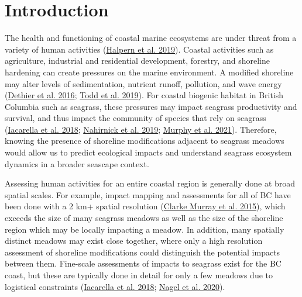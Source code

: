 \documentclass[12pt]{article}\usepackage[]{graphicx}\usepackage[]{color}
\begin{document}

\frontmatter


\renewcommand{\headrulewidth}{0.5pt}  %
\renewcommand{\footrulewidth}{0.5pt}  %

\newcommand{\lt}{\ensuremath <}
\newcommand{\gt}{\ensuremath >}

\newlength{\cslhangindent}
\setlength{\cslhangindent}{1.5em}
\newenvironment{cslreferences}%
  {}%
  {\par}

\hypertarget{introduction}{%
\section{Introduction}\label{introduction}}

The health and functioning of coastal marine ecosystems are under threat from a variety of human activities (\protect\hyperlink{ref-Halpern2019}{Halpern et al. 2019}). Coastal activities such as agriculture, industrial and residential development, forestry, and shoreline hardening can create pressures on the marine environment. A modified shoreline may alter levels of sedimentation, nutrient runoff, pollution, and wave energy (\protect\hyperlink{ref-Dethier2016}{Dethier et al. 2016}; \protect\hyperlink{ref-Todd2019}{Todd et al. 2019}). For coastal biogenic habitat in British Columbia such as seagrass, these pressures may impact seagrass productivity and survival, and thus impact the community of species that rely on seagrass (\protect\hyperlink{ref-Iacarella2018}{Iacarella et al. 2018}; \protect\hyperlink{ref-Nahirnick2019}{Nahirnick et al. 2019}; \protect\hyperlink{ref-Murphy2021a}{Murphy et al. 2021}). Therefore, knowing the presence of shoreline modifications adjacent to seagrass meadows would allow us to predict ecological impacts and understand seagrass ecosystem dynamics in a broader seascape context.

Assessing human activities for an entire coastal region is generally done at broad spatial scales. For example, impact mapping and assessments for all of BC have been done with a 2 km+ spatial resolution (\protect\hyperlink{ref-ClarkeMurray2015}{Clarke Murray et al. 2015}), which exceeds the size of many seagrass meadows as well as the size of the shoreline region which may be locally impacting a meadow. In addition, many spatially distinct meadows may exist close together, where only a high resolution assessment of shoreline modifications could distinguish the potential impacts between them. Fine-scale assessments of impacts to seagrass exist for the BC coast, but these are typically done in detail for only a few meadows due to logistical constraints (\protect\hyperlink{ref-Iacarella2018}{Iacarella et al. 2018}; \protect\hyperlink{ref-Nagel2020}{Nagel et al. 2020}).
\end{document}
